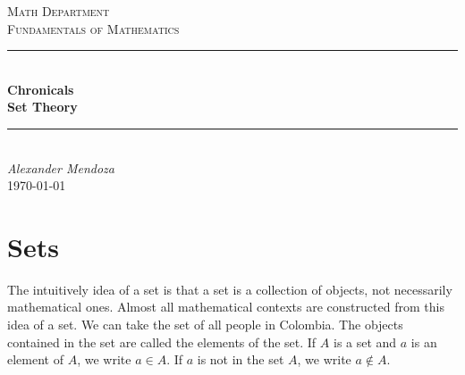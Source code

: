 \documentclass[11pt]{article}
\begin{document}
    \begin{titlepage}

        \newcommand{\HRule}{\rule{\linewidth}{0.5mm}}
        \newcommand{\department}{Math Department}
        \newcommand{\course}{Fundamentals of Mathematics}
        \newcommand{\titleValue}{Chronicals}
        \newcommand{\subtitleValue}{Set Theory}
        \newcommand{\authorName}{Alexander Mendoza}

        \center


        \vspace{0.5cm}
        \textsc{\Large \department}\\[0.5cm]
        \textsc{\Large \course}\\[0.5cm]
        \vfill


        \HRule\\
        \Huge
        \textbf{\titleValue}\\[0.5cm]
        \Large
        \textbf{\subtitleValue}\\
        \HRule\\[0.5cm]


        \vfill
        \Large
        \textit{\authorName}\\
        {\large \today}\\[2cm]

    \end{titlepage}
\section{Sets}
    The intuitively idea of a set is that a set is a collection of objects, not necessarily mathematical ones. Almost all mathematical contexts are constructed from this idea of a set. We can take the set of all people in Colombia. The objects contained in the set are called the elements of the set. If $A$ is a set and $a$ is an element of $A$, we write $a \in A$. If $a$ is not in the set $A$, we write $a \notin A$.
\end{document}
